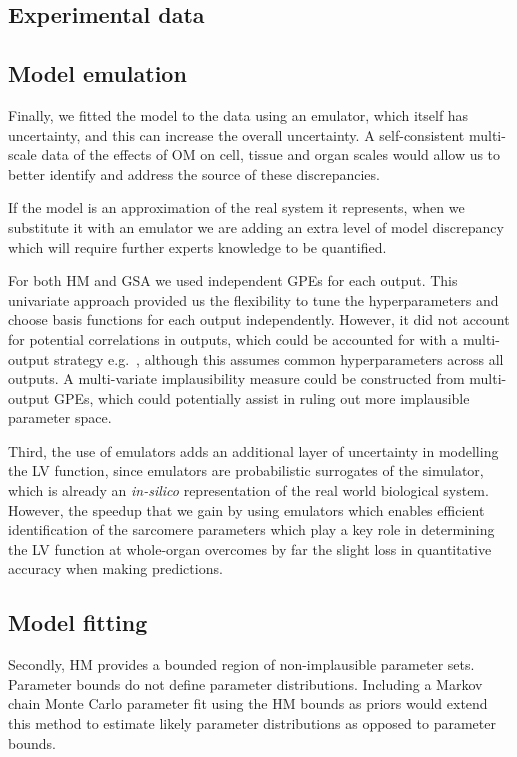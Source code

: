 %
%
%
\subsection{Experimental data}\label{sec:ch9experimental_data}

%
%
%
\subsection{Model emulation}\label{sec:ch9model_emulation}
Finally, we fitted the model to the data using an emulator, which itself has uncertainty, and this can increase the overall uncertainty. A self-consistent multi-scale data of the effects of OM on cell, tissue and organ scales would allow us to better identify and address the source of these discrepancies.

\vspace{0.2cm}
If the model is an approximation of the real system it represents, when we substitute it with an emulator we are adding an extra level of model discrepancy which will require further experts knowledge to be quantified.

\vspace{0.2cm}
For both HM and GSA we used independent GPEs for each output. This univariate approach provided us the flexibility to tune the hyperparameters and choose basis functions for each output independently. However, it did not account for potential correlations in outputs, which could be accounted for with a multi-output strategy e.g.~\cite{Conti:2009}, although this assumes common hyperparameters across all outputs. A multi-variate implausibility measure could be constructed from multi-output GPEs, which could potentially assist in ruling out more implausible parameter space.

\vspace{0.2cm}
Third, the use of emulators adds an additional layer of uncertainty in modelling the LV function, since emulators are probabilistic surrogates of the simulator, which is already an \textit{in-silico} representation of the real world biological system. However, the speedup that we gain by using emulators which enables efficient identification of the sarcomere parameters which play a key role in determining the LV function at whole-organ overcomes by far the slight loss in quantitative accuracy when making predictions.


%
%
%
\subsection{Model fitting}\label{sec:ch9model_fitting}
Secondly, HM provides a bounded region of non-implausible parameter sets. Parameter bounds do not define parameter distributions. Including a Markov chain Monte Carlo parameter fit using the HM bounds as priors would extend this method to estimate likely parameter distributions as opposed to parameter bounds.

